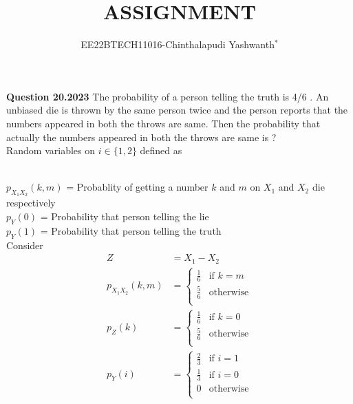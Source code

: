 \documentclass[journal,12pt,twocolumn]{IEEEtran}
\theoremstyle{remark}
\begin{document}

\vspace{3cm}

\title{ASSIGNMENT}
\author{EE22BTECH11016-Chinthalapudi Yashwanth$^{*}$%
}
\maketitle
\newpage
\bigskip
\renewcommand{\thefigure}{\theenumi}
\renewcommand{\thetable}{\theenumi}

\textbf{Question 20.2023}
The probability of a person telling the truth is 4/6 . An unbiased die is thrown by
the same person twice and the person reports that the numbers appeared in both
the throws are same. Then the probability that actually the numbers appeared in
both the throws are same is ?\\
\solution
Random variables on $i \in \{1,2\} $ defined as
\begin{table}[!ht]
	
\end{table}\\
$p_{X_{1}X_{2}}(k,m)$ = Probablity of getting a number $k$ and $m$ on $X_1$ and $X_2$ die respectively\\
$p_Y(0)$ = Probability that person telling the lie\\
$p_Y(1)$ = Probability that person telling the truth\\
Consider
\begin{align}
Z&=X_1-X_2\\
p_{X_{1}X_{2}}(k,m)&=\begin{cases}
            \frac{1}{6}  & \text{if } k = m\\
            \frac{5}{6} & \text{otherwise}\\
        \end{cases}\\
p_Z(k)&=\begin{cases}
            \frac{1}{6}  & \text{if } k = 0\\
            \frac{5}{6} & \text{otherwise}\\
        \end{cases}\\
p_Y(i) &= \begin{cases}
	    \frac{2}{3} & \text{if } i = 1\\
	    \frac{1}{3} & \text{if } i = 0\\
	    0 & \text{otherwise}\\
          \end{cases}
\end{align}
\end{document}
